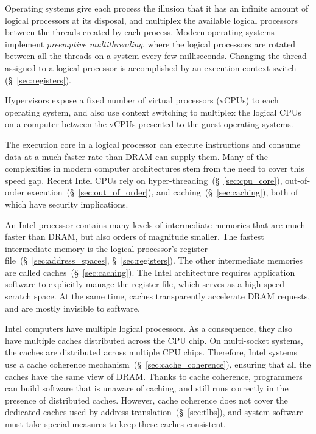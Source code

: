 Operating systems give each process the illusion that it has an infinite amount
of logical processors at its disposal, and multiplex the available logical
processors between the threads created by each process. Modern operating
systems implement \textit{preemptive multithreading}, where the logical
processors are rotated between all the threads on a system every few
milliseconds. Changing the thread assigned to a logical processor is
accomplished by an execution context switch (\S~\ref{sec:registers}).

Hypervisors expose a fixed number of virtual processors (vCPUs) to each
operating system, and also use context switching to multiplex the logical CPUs
on a computer between the vCPUs presented to the guest operating systems.

The execution core in a logical processor can execute instructions and consume
data at a much faster rate than DRAM can supply them. Many of the complexities
in modern computer architectures stem from the need to cover this speed gap.
Recent Intel CPUs rely on hyper-threading~(\S~\ref{sec:cpu_core}),
out-of-order execution~(\S~\ref{sec:out_of_order}), and
caching~(\S~\ref{sec:caching}), both of which have security implications.

An Intel processor contains many levels of intermediate memories that are much
faster than DRAM, but also orders of magnitude smaller.  The fastest
intermediate memory is the logical processor's register
file~(\S~\ref{sec:address_spaces}, \S~\ref{sec:registers}). The other
intermediate memories are called caches~(\S~\ref{sec:caching}). The Intel
architecture requires application software to explicitly manage the register
file, which serves as a high-speed scratch space. At the same time, caches
transparently accelerate DRAM requests, and are mostly invisible to software.

Intel computers have multiple logical processors. As a consequence, they also
have multiple caches distributed across the CPU chip. On multi-socket systems,
the caches are distributed across multiple CPU chips. Therefore, Intel systems
use a cache coherence mechanism~(\S~\ref{sec:cache_coherence}), ensuring that
all the caches have the same view of DRAM. Thanks to cache coherence,
programmers can build software that is unaware of caching, and still runs
correctly in the presence of distributed caches. However, cache coherence does
not cover the dedicated caches used by address translation~(\S~\ref{sec:tlbs}),
and system software must take special measures to keep these caches consistent.

